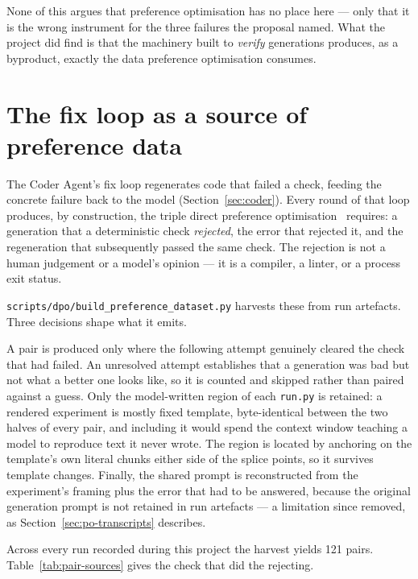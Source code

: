 None of this argues that preference optimisation has no place here --- only that
it is the wrong instrument for the three failures the proposal named. What the
project did find is that the machinery built to \emph{verify} generations
produces, as a byproduct, exactly the data preference optimisation consumes.

\section{The fix loop as a source of preference data}
\label{sec:po-dataset}

The Coder Agent's fix loop regenerates code that failed a check, feeding the
concrete failure back to the model (Section~\ref{sec:coder}). Every round of
that loop produces, by construction, the triple direct preference
optimisation~\cite{rafailov2023dpo} requires: a generation that a deterministic
check \emph{rejected}, the error that rejected it, and the regeneration that
subsequently passed the same check. The rejection is not a human judgement or a
model's opinion --- it is a compiler, a linter, or a process exit status.

\texttt{scripts/dpo/build\_preference\_dataset.py} harvests these from run
artefacts. Three decisions shape what it emits.

A pair is produced only where the following attempt genuinely cleared the check
that had failed. An unresolved attempt establishes that a generation was bad but
not what a better one looks like, so it is counted and skipped rather than
paired against a guess. Only the model-written region of each \texttt{run.py} is
retained: a rendered experiment is mostly fixed template, byte-identical between
the two halves of every pair, and including it would spend the context window
teaching a model to reproduce text it never wrote. The region is located by
anchoring on the template's own literal chunks either side of the splice
points, so it survives template changes. Finally, the shared prompt is
reconstructed from the experiment's framing plus the error that had to be
answered, because the original generation prompt is not retained in run
artefacts --- a limitation since removed, as Section~\ref{sec:po-transcripts}
describes.

Across every run recorded during this project the harvest yields 121 pairs.
Table~\ref{tab:pair-sources} gives the check that did the rejecting.

